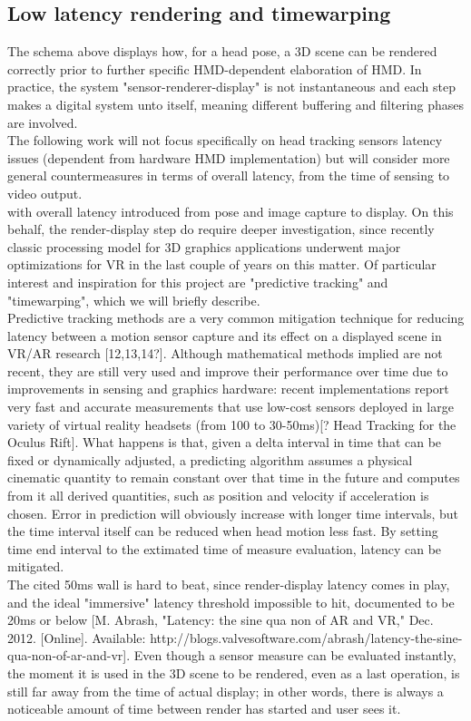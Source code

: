 \subsection{Low latency rendering and timewarping}
The schema above displays how, for a head pose, a 3D scene can be rendered correctly prior to further specific HMD-dependent elaboration of HMD. In practice, the system "sensor-renderer-display" is not instantaneous and each step makes a digital system unto itself, meaning different buffering and filtering phases are involved.\\
The following work will not focus specifically on head tracking sensors latency issues (dependent from hardware HMD implementation) but will consider more general countermeasures in terms of overall latency, from the time of sensing to video output.\\
with overall latency introduced from pose and image capture to display. On this behalf, the render-display step do require deeper investigation, since recently classic processing model for 3D graphics applications underwent major optimizations for VR in the last couple of years on this matter. Of particular interest and inspiration for this project are "predictive tracking" and "timewarping", which we will briefly describe.\\
Predictive tracking methods are a very common mitigation technique for reducing latency between a motion sensor capture and its effect on a displayed scene in VR/AR research [12,13,14?]. Although mathematical methods implied are not recent, they are still very used and improve their performance over time due to improvements in sensing and graphics hardware: recent implementations report very fast and accurate measurements that use low-cost sensors deployed in large variety of virtual reality headsets (from 100 to 30-50ms)[? Head Tracking for the Oculus Rift]. What happens is that, given a delta interval in time that can be fixed or dynamically adjusted, a predicting algorithm assumes a physical cinematic quantity to remain constant over that time in the future and computes from it all derived quantities, such as position and velocity if acceleration is chosen. Error in prediction will obviously increase with longer time intervals, but the time interval itself can be reduced when head motion less fast. By setting time end interval to the extimated time of measure evaluation, latency can be mitigated.\\
The cited 50ms wall is hard to beat, since render-display latency comes in play, and the ideal "immersive" latency threshold impossible to hit, documented to be 20ms or below [M. Abrash, "Latency: the sine qua non of AR and VR," Dec. 2012. [Online]. Available: http://blogs.valvesoftware.com/abrash/latency-the-sine-qua-non-of-ar-and-vr]. Even though a sensor measure can be evaluated instantly, the moment it is used in the 3D scene to be rendered, even as a last operation, is still far away from the time of actual display; in other words, there is always a noticeable amount of time between render has started and user sees it.\\
